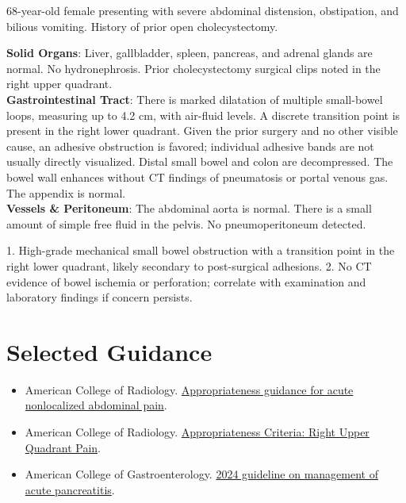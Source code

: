 \begin{testbox}[Indications:]
68-year-old female presenting with severe abdominal distension, obstipation, and bilious vomiting. History of prior open cholecystectomy.
\end{testbox}
\begin{refbox}[Findings:]
\textbf{Solid Organs}: Liver, gallbladder, spleen, pancreas, and adrenal glands are normal. No hydronephrosis. Prior cholecystectomy surgical clips noted in the right upper quadrant.\\
\textbf{Gastrointestinal Tract}: There is marked dilatation of multiple small-bowel loops, measuring up to 4.2 cm, with air-fluid levels. A discrete transition point is present in the right lower quadrant. Given the prior surgery and no other visible cause, an adhesive obstruction is favored; individual adhesive bands are not usually directly visualized. Distal small bowel and colon are decompressed. The bowel wall enhances without CT findings of pneumatosis or portal venous gas. The appendix is normal.\\
\textbf{Vessels \& Peritoneum}: The abdominal aorta is normal. There is a small amount of simple free fluid in the pelvis. No pneumoperitoneum detected.
\end{refbox}
\begin{pearlbox}[Impression:]
1. High-grade mechanical small bowel obstruction with a transition point in the right lower quadrant, likely secondary to post-surgical adhesions.
2. No CT evidence of bowel ischemia or perforation; correlate with examination and laboratory findings if concern persists.
\end{pearlbox}

\section*{Selected Guidance}
\begin{itemize}
    \item American College of Radiology. \href{https://www.radiologyinfo.org/en/info/acs-acute-nonlocalized-abdominal-pain}{Appropriateness guidance for acute nonlocalized abdominal pain}.
    \item American College of Radiology. \href{https://acsearch.acr.org/docs/69474/Narrative/}{Appropriateness Criteria: Right Upper Quadrant Pain}.
    \item American College of Gastroenterology. \href{https://pubmed.ncbi.nlm.nih.gov/38857482/}{2024 guideline on management of acute pancreatitis}.
\end{itemize}

\clearpage
